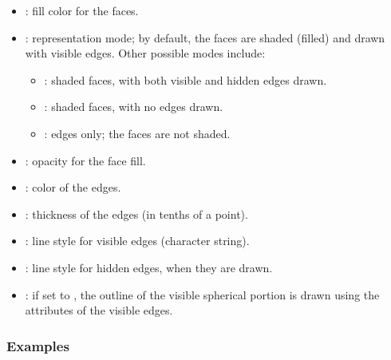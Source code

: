 \begin{itemize}
    \item {}: fill color for the faces. 
    \item {}: representation mode; by default, the faces are shaded (filled) and drawn with visible edges. Other possible modes include:
    \begin{itemize}
        \item {}: shaded faces, with both visible and hidden edges drawn. 
        \item {}: shaded faces, with no edges drawn. 
        \item {}: edges only; the faces are not shaded. 
    \end{itemize}
    \item {}: opacity for the face fill. 
    \item {}: color of the edges.
    \item {}: thickness of the edges (in tenths of a point). 
    \item {}: line style for visible edges (character string). 
    \item {}: line style for hidden edges, when they are drawn. 
    \item {}: if set to \true, the outline of the visible spherical portion is drawn using the attributes of the visible edges.
\end{itemize}

\subsubsection{Examples}

